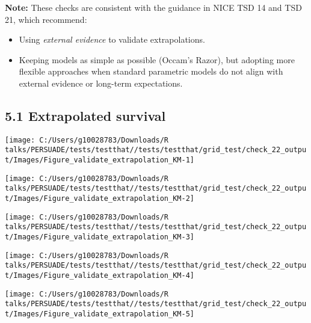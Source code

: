 \documentclass[
]{article}
\providecommand{\tightlist}{%
  \setlength{\itemsep}{0pt}\setlength{\parskip}{0pt}}
\begin{document}
\textbf{Note:} These checks are consistent with the guidance in NICE TSD
14 and TSD 21, which recommend:

\begin{itemize}
\tightlist
\item
  Using \emph{external evidence} to validate extrapolations.\\
\item
  Keeping models as simple as possible (Occam's Razor), but adopting
  more flexible approaches when standard parametric models do not align
  with external evidence or long-term expectations.
\end{itemize}

\subsection{5.1 Extrapolated survival}\label{extrapolated-survival}

\begin{flushleft}\texttt{[image: C:/Users/g10028783/Downloads/R talks/PERSUADE/tests/testthat//tests/testthat/grid\_test/check\_22\_output/Images/Figure\_validate\_extrapolation\_KM-1]} \end{flushleft}

\begin{flushleft}\texttt{[image: C:/Users/g10028783/Downloads/R talks/PERSUADE/tests/testthat//tests/testthat/grid\_test/check\_22\_output/Images/Figure\_validate\_extrapolation\_KM-2]} \end{flushleft}

\begin{flushleft}\texttt{[image: C:/Users/g10028783/Downloads/R talks/PERSUADE/tests/testthat//tests/testthat/grid\_test/check\_22\_output/Images/Figure\_validate\_extrapolation\_KM-3]} \end{flushleft}

\begin{flushleft}\texttt{[image: C:/Users/g10028783/Downloads/R talks/PERSUADE/tests/testthat//tests/testthat/grid\_test/check\_22\_output/Images/Figure\_validate\_extrapolation\_KM-4]} \end{flushleft}

\begin{flushleft}\texttt{[image: C:/Users/g10028783/Downloads/R talks/PERSUADE/tests/testthat//tests/testthat/grid\_test/check\_22\_output/Images/Figure\_validate\_extrapolation\_KM-5]} \end{flushleft}
\end{document}
